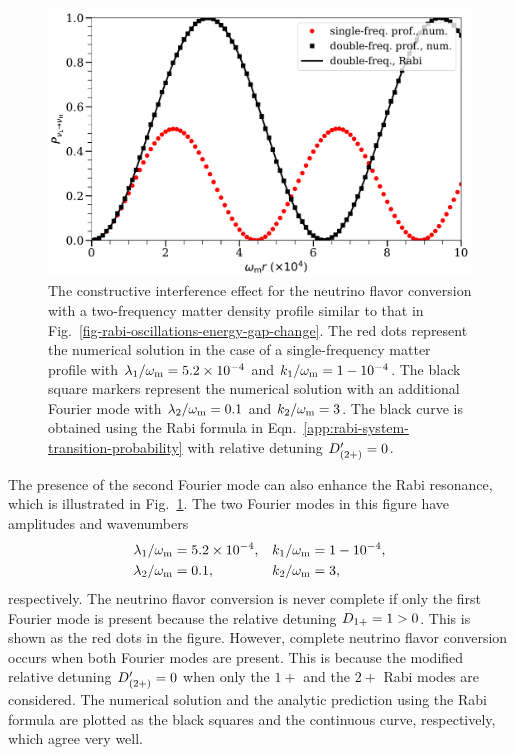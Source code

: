 \begin{figure}[!htbp]
    \centering
    \includegraphics[width=\textwidth]{chapters/assets/matter/interference-enhance-slide-with-legend}
    \caption{The constructive interference effect for the neutrino flavor conversion with a two-frequency matter density profile similar to that in Fig.~\ref{fig-rabi-oscillations-energy-gap-change}. The red dots represent the numerical solution in the case of a single-frequency matter profile with $\lambda_1 /\omega_\mathrm m = 5.2\times 10^{-4}$ and $k_1/\omega_\mathrm m = 1- 10^{-4}$. The black square markers represent the numerical solution with an additional Fourier mode with $\lambda_2/\omega_\mathrm m=0.1$ and $k_2/\omega_\mathrm m=3$. The black curve is obtained using the Rabi formula in Eqn.~\eqref{app:rabi-system-transition-probability} with relative detuning $D'_{(2+)}=0$.}
    \label{chap:matter-sec:constructive-fig:two-frequencies-constructive}
\end{figure}

The presence of the second Fourier mode can also enhance the Rabi resonance, which is illustrated in Fig.~\ref{chap:matter-sec:constructive-fig:two-frequencies-constructive}. The two Fourier modes in this figure have amplitudes and wavenumbers
\begin{align*}
    \lambda_1/\omega_\mathrm m & =5.2\times 10^{-4}, & k_1/\omega_\mathrm m &= 1- 10^{-4},\\
    \lambda_2/\omega_\mathrm m & =0.1, & k_2/\omega_\mathrm m &= 3,
\end{align*}
respectively. The neutrino flavor conversion is never complete if only the first Fourier mode is present because the relative detuning $D_{1+}=1 > 0$. This is shown as the red dots in the figure. However, complete neutrino flavor conversion occurs when both Fourier modes are present. This is because the modified relative detuning $D'_{(2+)} = 0$ when only the $1+$ and the $2+$ Rabi modes are considered. The numerical solution and the analytic prediction using the Rabi formula are plotted as the black squares and the continuous curve, respectively, which agree very well.


